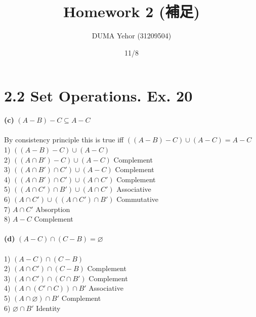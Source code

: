 \documentclass{article}
\title{Homework 2 (補足)}
\author{DUMA Yehor (31209504)}
\date{11/8}
\begin{document}
\maketitle

\section{2.2 Set Operations. Ex. 20}

\textbf{(c)} $(A-B)-C \subseteq A-C$ \\ \\
By consistency principle this is true iff
$((A-B)-C)\cup (A-C) = A-C$ \\
1) $((A-B)-C)\cup (A-C)$ \\
2) $((A \cap B')-C)\cup (A-C)$\hspace*{\fill} Complement \\
3) $((A \cap B')\cap C')\cup (A-C)$\hspace*{\fill} Complement \\
4) $((A \cap B')\cap C')\cup (A\cap C')$\hspace*{\fill} Complement \\
5) $((A \cap C')\cap B')\cup (A\cap C')$\hspace*{\fill} Associative \\
6) $(A\cap C') \cup ((A \cap C')\cap B')$\hspace*{\fill} Commutative \\
7) $A\cap C'$\hspace*{\fill} Absorption \\
8) $A-C$\hspace*{\fill} Complement \\ \\
\textbf{(d)} $(A-C) \cap (C-B) = \varnothing$ \\ \\
1) $(A-C) \cap (C-B)$ \\
2) $(A \cap C') \cap (C-B)$ \hspace*{\fill} Complement \\ 
3) $(A \cap C') \cap (C \cap B')$ \hspace*{\fill} Complement \\ 
4) $(A \cap (C' \cap C)) \cap B'$ \hspace*{\fill} Associative \\ 
5) $(A \cap \varnothing) \cap B'$ \hspace*{\fill} Complement \\ 
6) $\varnothing \cap B'$ \hspace*{\fill} Identity \\ 
\end{document}
